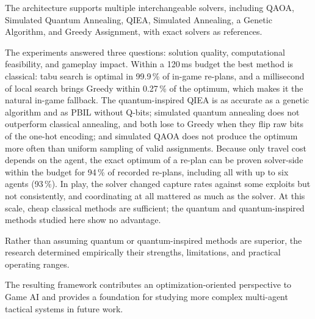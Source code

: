 \documentclass[12pt, a4paper]{article}
\begin{document}
The architecture supports multiple interchangeable solvers, including QAOA, Simulated Quantum Annealing, QIEA, Simulated Annealing, a Genetic Algorithm, and Greedy Assignment, with exact solvers as references.

The experiments answered three questions: solution quality, computational feasibility, and gameplay impact. Within a 120\,ms budget the best method is classical: tabu search is optimal in 99.9\,\% of in-game re-plans, and a millisecond of local search brings Greedy within 0.27\,\% of the optimum, which makes it the natural in-game fallback. The quantum-inspired QIEA is as accurate as a genetic algorithm and as PBIL without Q-bits; simulated quantum annealing does not outperform classical annealing, and both lose to Greedy when they flip raw bits of the one-hot encoding; and simulated QAOA does not produce the optimum more often than uniform sampling of valid assignments. Because only travel cost depends on the agent, the exact optimum of a re-plan can be proven solver-side within the budget for 94\,\% of recorded re-plans, including all with up to six agents (93\,\%). In play, the solver changed capture rates against some exploits but not consistently, and coordinating at all mattered as much as the solver. At this scale, cheap classical methods are sufficient; the quantum and quantum-inspired methods studied here show no advantage.

Rather than assuming quantum or quantum-inspired methods are superior, the research determined empirically their strengths, limitations, and practical operating ranges.

The resulting framework contributes an optimization-oriented perspective to Game AI and provides a foundation for studying more complex multi-agent tactical systems in future work.
\end{document}
